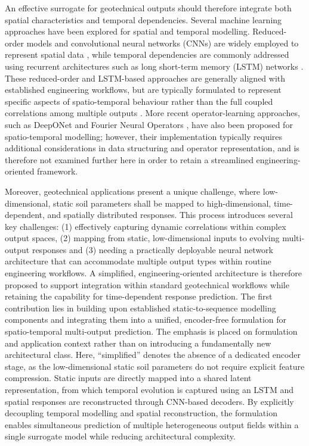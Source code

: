 An effective surrogate for geotechnical outputs should therefore integrate both spatial characteristics and temporal dependencies. Several machine learning approaches have been explored for spatial and temporal modelling. Reduced-order models and convolutional neural networks (CNNs) are widely employed to represent spatial data \parencite{liu2019,smith2019,tian2020,recanatesi2021,lui2021,huang2022,xu2023,raju2024}, while temporal dependencies are commonly addressed using recurrent architectures such as long short-term memory (LSTM) networks \parencite{zhou2022,wang2022,jiang2023,de2024,ma2024,bian2025,yu2015,benabou2021,qiu2025}. These reduced-order and LSTM-based approaches are generally aligned with established engineering workflows, but are typically formulated to represent specific aspects of spatio-temporal behaviour rather than the full coupled correlations among multiple outputs \parencite{zhang2022,kapusuzoglu2022,sun2023,wu2024,lin2024,xie2024,bian2025}. More recent operator-learning approaches, such as DeepONet and Fourier Neural Operators \parencite{li2023,li2024}, have also been proposed for spatio-temporal modelling; however, their implementation typically requires additional considerations in data structuring and operator representation, and is therefore not examined further here in order to retain a streamlined engineering-oriented framework.

Moreover, geotechnical applications present a unique challenge, where low-dimensional, static soil parameters shall be mapped to high-dimensional, time-dependent, and spatially distributed responses. This process introduces several key challenges: (1) effectively capturing dynamic correlations within complex output spaces, (2) mapping from static, low-dimensional inputs to evolving multi-output responses and (3) needing a practically deployable neural network architecture that can accommodate multiple output types within routine engineering workflows. A simplified, engineering-oriented architecture is therefore proposed to support integration within standard geotechnical workflows while retaining the capability for time-dependent response prediction. The first contribution lies in building upon established static-to-sequence modelling components and integrating them into a unified, encoder-free formulation for spatio-temporal multi-output prediction. The emphasis is placed on formulation and application context rather than on introducing a fundamentally new architectural class. Here, “simplified” denotes the absence of a dedicated encoder stage, as the low-dimensional static soil parameters do not require explicit feature compression. Static inputs are directly mapped into a shared latent representation, from which temporal evolution is captured using an LSTM and spatial responses are reconstructed through CNN-based decoders. By explicitly decoupling temporal modelling and spatial reconstruction, the formulation enables simultaneous prediction of multiple heterogeneous output fields within a single surrogate model while reducing architectural complexity.

